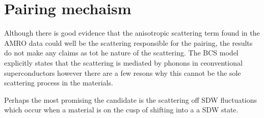 \section{Pairing mechaism}
\label{Sec:Intro:PairingMechanism}

Although there is good evidence that the anisotropic scattering term found in the \ac{AMRO} data could well be the scattering responsible for the pairing, the results do not make any claims as tot he nature of the scattering. The \ac{BCS} model explicitly states that the scattering is mediated by phonons in ceonventional superconductors however there are a few resons why this cannot be the sole scattering process in the \highTc materials.


Perhaps the most promising the candidate is the scattering off \ac{SDW} fluctuations which occur when a material is on the cusp of shifting into a a \ac{SDW} state. 

